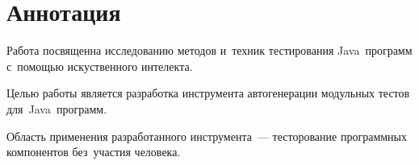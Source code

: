 \chapter*{Аннотация} \label{annotation}


\hspace*{2.5em}Работа посвященна исследованию методов и~техник тестирования Java~программ с~помощью искуственного интелекта. 

Целью работы является разработка инструмента автогенерации модульных тестов для~Java~программ. 

Область применения разработанного инструмента~--- тесторование программных компонентов без~участия человека. 